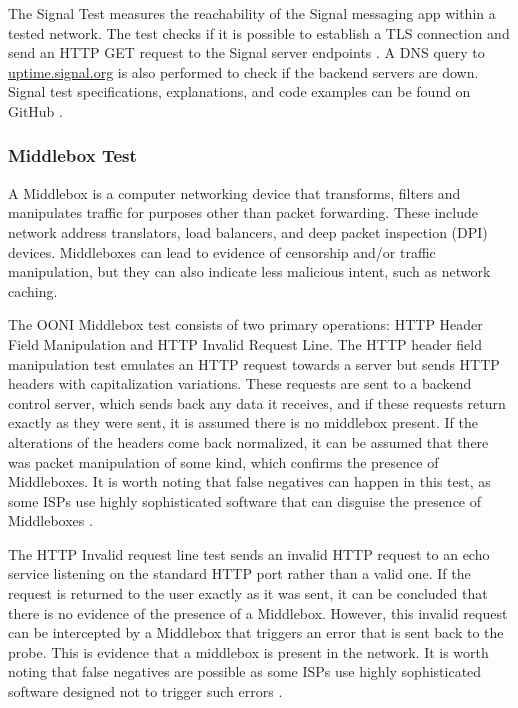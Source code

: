 The Signal Test measures the reachability of the Signal messaging app within a tested network. The test checks if it is possible to establish a TLS connection and send an HTTP GET request to the Signal server endpoints \cite{ooniSignalTest}. A DNS query to \url{uptime.signal.org} is also performed to check if the backend servers are down. Signal test specifications, explanations, and code examples can be found on GitHub \cite{SignalTestGitHub}. 

\subsubsection{Middlebox Test}

A Middlebox is a computer networking device that transforms, filters and manipulates traffic for purposes other than packet forwarding. These include network address translators, load balancers, and deep packet inspection (DPI) devices. Middleboxes can lead to evidence of censorship and/or traffic manipulation, but they can also indicate less malicious intent, such as network caching.

The OONI Middlebox test consists of two primary operations: HTTP Header Field Manipulation and HTTP Invalid Request Line. The HTTP header field manipulation test emulates an HTTP request towards a server but sends HTTP headers with capitalization variations. These requests are sent to a backend control server, which sends back any data it receives, and if these requests return exactly as they were sent, it is assumed there is no middlebox present. If the alterations of the headers come back normalized, it can be assumed that there was packet manipulation of some kind, which confirms the presence of Middleboxes. It is worth noting that false negatives can happen in this test, as some ISPs use highly sophisticated software that can disguise the presence of Middleboxes \cite{ooniHTTPHeader}.  

The HTTP Invalid request line test sends an invalid HTTP request to an echo service listening on the standard HTTP port rather than a valid one. If the request is returned to the user exactly as it was sent, it can be concluded that there is no evidence of the presence of a Middlebox. However, this invalid request can be intercepted by a Middlebox that triggers an error that is sent back to the probe. This is evidence that a middlebox is present in the network. It is worth noting that false negatives are possible as some ISPs use highly sophisticated software designed not to trigger such errors \cite{ooniHTTPInvalid}.

